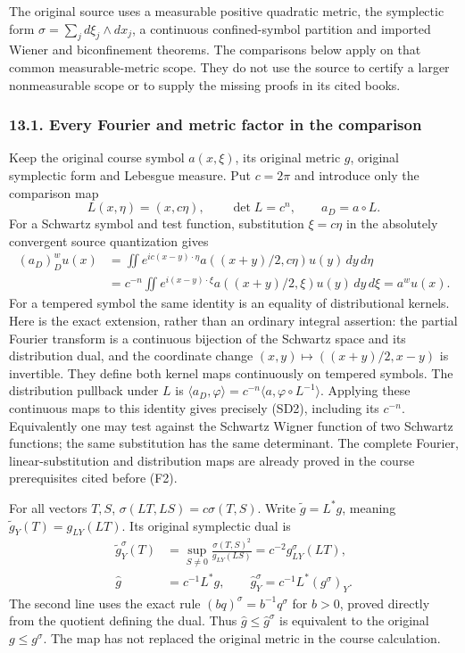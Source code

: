 \documentclass[
  11pt,
]{article}
\begin{document}
The original source uses a measurable positive quadratic metric, the
symplectic form \(\sigma=\sum_jd\xi_j\wedge dx_j\), a continuous
confined-symbol partition and imported Wiener and biconfinement
theorems. The comparisons below apply on that common measurable-metric
scope. They do not use the source to certify a larger nonmeasurable
scope or to supply the missing proofs in its cited books.

\subsubsection{13.1. Every Fourier and metric factor in the
comparison}\label{every-fourier-and-metric-factor-in-the-comparison}

Keep the original course symbol \(a(x,\xi)\), its original metric \(g\),
original symplectic form and Lebesgue measure. Put \(c=2\pi\) and
introduce only the comparison map \[
 L(x,\eta)=(x,c\eta),\qquad \det L=c^n,
 \qquad a_D=a\circ L.
 \tag{SD1}
\] For a Schwartz symbol and test function, substitution \(\xi=c\eta\)
in the absolutely convergent source quantization gives \[
 \begin{aligned}
 (a_D)^w_Du(x)
 &=\iint e^{ic(x-y)\cdot\eta}
      a((x+y)/2,c\eta)u(y)\,dy\,d\eta\\
 &=c^{-n}\iint e^{i(x-y)\cdot\xi}
      a((x+y)/2,\xi)u(y)\,dy\,d\xi
 =a^wu(x).
 \end{aligned}
 \tag{SD2}
\] For a tempered symbol the same identity is an equality of
distributional kernels. Here is the exact extension, rather than an
ordinary integral assertion: the partial Fourier transform is a
continuous bijection of the Schwartz space and its distribution dual,
and the coordinate change \((x,y)\mapsto((x+y)/2,x-y)\) is invertible.
They define both kernel maps continuously on tempered symbols. The
distribution pullback under \(L\) is
\(\langle a_D,\varphi\rangle=c^{-n}\langle a,\varphi\circ L^{-1}\rangle\).
Applying these continuous maps to this identity gives precisely (SD2),
including its \(c^{-n}\). Equivalently one may test against the Schwartz
Wigner function of two Schwartz functions; the same substitution has the
same determinant. The complete Fourier, linear-substitution and
distribution maps are already proved in the course prerequisites cited
before (F2).

For all vectors \(T,S\), \(\sigma(LT,LS)=c\sigma(T,S)\). Write
\(\widetilde g=L^*g\), meaning \(\widetilde g_Y(T)=g_{LY}(LT)\). Its
original symplectic dual is \[
 \begin{aligned}
 \widetilde g_Y^\sigma(T)
 &=\sup_{S\ne0}\frac{\sigma(T,S)^2}{g_{LY}(LS)}
 =c^{-2}g_{LY}^\sigma(LT),\\
 \widehat g&=c^{-1}L^*g,
 \qquad \widehat g_Y^\sigma=c^{-1}L^*(g^\sigma)_Y.
 \end{aligned}
 \tag{SD3}
\] The second line uses the exact rule \((bq)^\sigma=b^{-1}q^\sigma\)
for \(b>0\), proved directly from the quotient defining the dual. Thus
\(\widehat g\le\widehat g^\sigma\) is equivalent to the original
\(g\le g^\sigma\). The map has not replaced the original metric in the
course calculation.
\end{document}
